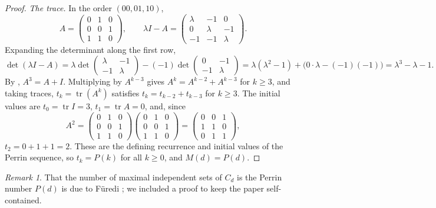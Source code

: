 \documentclass[11pt]{article}
\theoremstyle{plain}
\theoremstyle{definition}
\theoremstyle{remark}
\newtheorem{remark}[remark]{Remark}
\newcommand{\Per}{P}
\DeclareMathOperator{\tr}{tr}
\begin{document}
\begin{proof}
\emph{The trace.} In the order $(00, 01, 10)$,
\[
A = \begin{pmatrix} 0 & 1 & 0 \\ 0 & 0 & 1 \\ 1 & 1 & 0 \end{pmatrix},
\qquad
\lambda I - A = \begin{pmatrix} \lambda & -1 & 0 \\ 0 & \lambda & -1 \\ -1 & -1 & \lambda
\end{pmatrix}.
\]
Expanding the determinant along the first row,
\[
\det(\lambda I - A)
= \lambda \det\begin{pmatrix} \lambda & -1 \\ -1 & \lambda \end{pmatrix}
  - (-1)\det\begin{pmatrix} 0 & -1 \\ -1 & \lambda \end{pmatrix}
= \lambda(\lambda^2 - 1) + \bigl(0 \cdot \lambda - (-1)(-1)\bigr)
= \lambda^3 - \lambda - 1 .
\]
By , $A^3 = A + I$. Multiplying by $A^{k-3}$ gives $A^k = A^{k-2} + A^{k-3}$ for
$k \ge 3$, and taking traces, $t_k = \tr(A^k)$ satisfies $t_k = t_{k-2} + t_{k-3}$ for
$k \ge 3$. The initial values are $t_0 = \tr I = 3$, $t_1 = \tr A = 0$, and, since
\[
A^2 = \begin{pmatrix} 0 & 1 & 0 \\ 0 & 0 & 1 \\ 1 & 1 & 0 \end{pmatrix}
      \begin{pmatrix} 0 & 1 & 0 \\ 0 & 0 & 1 \\ 1 & 1 & 0 \end{pmatrix}
    = \begin{pmatrix} 0 & 0 & 1 \\ 1 & 1 & 0 \\ 0 & 1 & 1 \end{pmatrix},
\]
$t_2 = 0 + 1 + 1 = 2$. These are the defining recurrence and initial values of the Perrin
sequence, so $t_k = \Per(k)$ for all $k \ge 0$, and $M(d) = \Per(d)$.
\end{proof}

\begin{remark}
That the number of maximal independent sets of $C_d$ is the Perrin number $\Per(d)$ is due to
F\"uredi \cite{Furedi1987}; we included a proof to keep the paper self-contained.
\end{remark}
\end{document}
